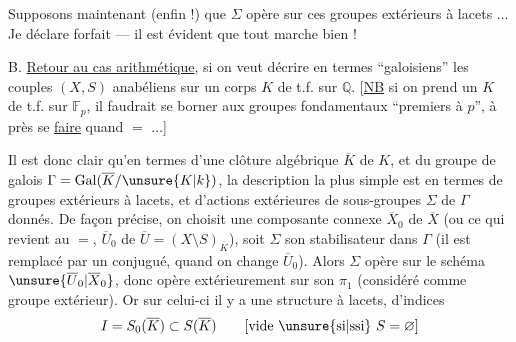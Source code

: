 Supposons maintenant (enfin !) que
\(\Sigma\) opère sur ces groupes extérieurs à lacets \(\ldots\)
Je déclare forfait --- il est évident que
tout marche bien !

B. \uline{Retour au cas arithmétique}, si on
veut décrire en termes ``galoisiens'' les
couples \((X,S)\)  anabéliens  sur un corps
\(K\) de t.f. sur \(\mathbb Q\). [\uline{NB} si on prend
un \(K\) de t.f. sur \(\mathbb F_p\), il faudrait se
borner aux groupes fondamentaux ``premiers à
\(p\)'', à  près 
se \uline{faire} quand \(=\) \(\ldots\)]

Il est donc clair qu'en termes d'une
clôture algébrique \(\overline K\) de \(K\), et du
groupe de galois  \(\Gamma=\operatorname{Gal}(\overline K/\unsure{K|k})\), la
description la plus simple est en
termes de groupes extérieurs à lacets, et
d'actions extérieures de sous-groupes  \(\Sigma\) de \(\Gamma\)
donnés. De façon précise,  on
choisit une composante connexe
\(\overline X_0\) de \(\overline X\) (ou ce qui revient au \(=\),
\(\overline U_0\) de \(\overline U=(X\setminus S)_{\overline K}\)), soit \(\Sigma\) son
stabilisateur dans \(\Gamma\) (il est remplacé
par un conjugué, quand on change
\(\overline U_0\)). Alors \(\Sigma\) opère sur le schéma
\(\unsure{\overline U_0|\overline X_0}\), donc opère extérieurement sur son
\(\pi_1\) (considéré comme groupe extérieur).
Or sur celui-ci il y a une structure
à lacets,   d'indices
\[
I=S_0(\overline K)\subset S(\overline K)
\qquad[\text{vide \unsure{si|ssi} }S=\varnothing]
\]
